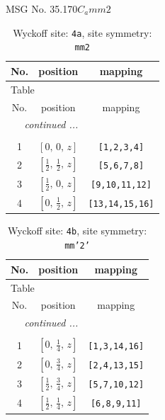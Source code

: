 \documentclass[fleqn,8pt]{jsarticle}
\begin{document}
\setcounter{MaxMatrixCols}{32}

\renewcommand{\tablename}{Table~}
\renewcommand{\figurename}{Figure~}
\begin{center}
\LARGE
MSG No. 35.170\quad$C_{a}mm2$
\end{center}
\renewcommand{\arraystretch}{1.2}
\begin{longtable}{ccc}
\caption{Wyckoff site: {\tt 4a}, site symmetry: {\tt mm2}}
 \\
 \hline \hline
No. & position & mapping \\ \hline \endfirsthead

\multicolumn{2}{l}{\tablename\ \thetable{}} \\
 \hline \hline
No. & position & mapping \\ \hline \endhead

 \hline \hline
\multicolumn{2}{r}{\footnotesize\it continued ...} \\ \endfoot

 \hline \hline
\multicolumn{2}{r}{} \\ \endlastfoot

1 & $\left[ 0,\, 0,\, z \right]$ & {\tt [1,2,3,4]} \\ \hline
2 & $\left[ \frac{1}{2},\, \frac{1}{2},\, z \right]$ & {\tt [5,6,7,8]} \\ \hline
3 & $\left[ \frac{1}{2},\, 0,\, z \right]$ & {\tt [9,10,11,12]} \\ \hline
4 & $\left[ 0,\, \frac{1}{2},\, z \right]$ & {\tt [13,14,15,16]} \\
\end{longtable}
\renewcommand{\arraystretch}{1.2}
\begin{longtable}{ccc}
\caption{Wyckoff site: {\tt 4b}, site symmetry: {\tt mm'2'}}
 \\
 \hline \hline
No. & position & mapping \\ \hline \endfirsthead

\multicolumn{2}{l}{\tablename\ \thetable{}} \\
 \hline \hline
No. & position & mapping \\ \hline \endhead

 \hline \hline
\multicolumn{2}{r}{\footnotesize\it continued ...} \\ \endfoot

 \hline \hline
\multicolumn{2}{r}{} \\ \endlastfoot

1 & $\left[ 0,\, \frac{1}{4},\, z \right]$ & {\tt [1,3,14,16]} \\ \hline
2 & $\left[ 0,\, \frac{3}{4},\, z \right]$ & {\tt [2,4,13,15]} \\ \hline
3 & $\left[ \frac{1}{2},\, \frac{3}{4},\, z \right]$ & {\tt [5,7,10,12]} \\ \hline
4 & $\left[ \frac{1}{2},\, \frac{1}{4},\, z \right]$ & {\tt [6,8,9,11]} \\
\end{longtable}
\end{document}
